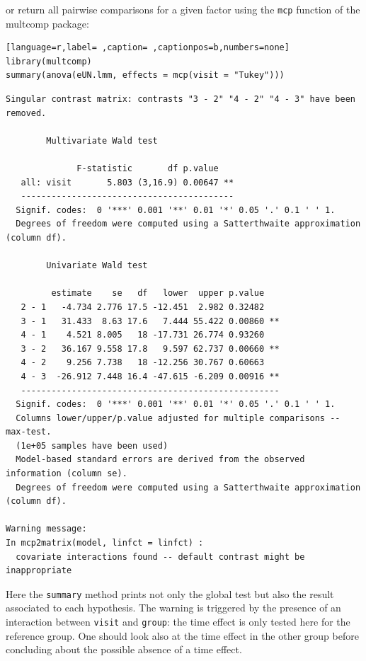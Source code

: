 \documentclass[12pt]{article}
\begin{document}
\clearpage

or return all pairwise comparisons for a given factor using the \texttt{mcp}
function of the multcomp package:
\begin{lstlisting}[language=r,label= ,caption= ,captionpos=b,numbers=none]
library(multcomp)
summary(anova(eUN.lmm, effects = mcp(visit = "Tukey")))
\end{lstlisting}

\begin{verbatim}
Singular contrast matrix: contrasts "3 - 2" "4 - 2" "4 - 3" have been removed. 

		Multivariate Wald test 

              F-statistic       df p.value   
   all: visit       5.803 (3,16.9) 0.00647 **
   ------------------------------------------ 
  Signif. codes:  0 '***' 0.001 '**' 0.01 '*' 0.05 '.' 0.1 ' ' 1.
  Degrees of freedom were computed using a Satterthwaite approximation (column df). 

		Univariate Wald test 

         estimate    se   df   lower  upper p.value   
   2 - 1   -4.734 2.776 17.5 -12.451  2.982 0.32482   
   3 - 1   31.433  8.63 17.6   7.444 55.422 0.00860 **
   4 - 1    4.521 8.005   18 -17.731 26.774 0.93260   
   3 - 2   36.167 9.558 17.8   9.597 62.737 0.00660 **
   4 - 2    9.256 7.738   18 -12.256 30.767 0.60663   
   4 - 3  -26.912 7.448 16.4 -47.615 -6.209 0.00916 **
   --------------------------------------------------- 
  Signif. codes:  0 '***' 0.001 '**' 0.01 '*' 0.05 '.' 0.1 ' ' 1.
  Columns lower/upper/p.value adjusted for multiple comparisons -- max-test.
  (1e+05 samples have been used)
  Model-based standard errors are derived from the observed information (column se). 
  Degrees of freedom were computed using a Satterthwaite approximation (column df). 

Warning message:
In mcp2matrix(model, linfct = linfct) :
  covariate interactions found -- default contrast might be inappropriate
\end{verbatim}

Here the \texttt{summary} method prints not only the global test but also the
result associated to each hypothesis. The warning is triggered by the
presence of an interaction between \texttt{visit} and \texttt{group}: the time
effect is only tested here for the reference group. One should look
also at the time effect in the other group before concluding about the
possible absence of a time effect.

\bigskip
\end{document}
